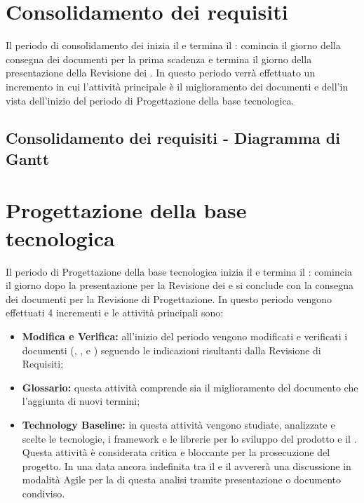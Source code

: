 \documentclass[PianoDiProgetto.tex]{subfiles}
\begin{document}
\section{Consolidamento dei requisiti}
Il periodo di consolidamento dei  inizia il  e termina il : comincia il giorno della consegna dei documenti per la prima scadenza e termina il giorno della presentazione della Revisione dei . In questo periodo verrà effettuato un incremento in cui l'attività principale è il miglioramento dei documenti e dell'\adr in vista dell'inizio del periodo di Progettazione della base tecnologica.
\subsection{Consolidamento dei requisiti - Diagramma di Gantt}

\newpage

\section{Progettazione della base tecnologica}
Il periodo di Progettazione della base tecnologica inizia il  e termina il : comincia il giorno dopo la presentazione per la Revisione dei  e si conclude con la consegna dei documenti per la Revisione di Progettazione. In questo periodo vengono effettuati 4 incrementi e le attività principali sono:

\begin{itemize}
	\item \textbf{Modifica e Verifica:} all'inizio del periodo vengono modificati e verificati i documenti (\ndp, \pdp, \pdq e \adr) seguendo le indicazioni risultanti dalla Revisione di Requisiti;
	\item \textbf{Glossario:} questa attività comprende sia il miglioramento del documento \g che l'aggiunta di nuovi termini;
	\item \textbf{Technology Baseline:} 
	in questa attività vengono studiate, analizzate e scelte le tecnologie, i framework e le librerie per lo sviluppo del prodotto e il . Questa attività è considerata critica e bloccante per la prosecuzione del progetto. In una data ancora indefinita tra il  e il  avvererà una discussione in modalità Agile per la  di questa analisi tramite presentazione o documento condiviso.
\end{itemize}
\end{document}
